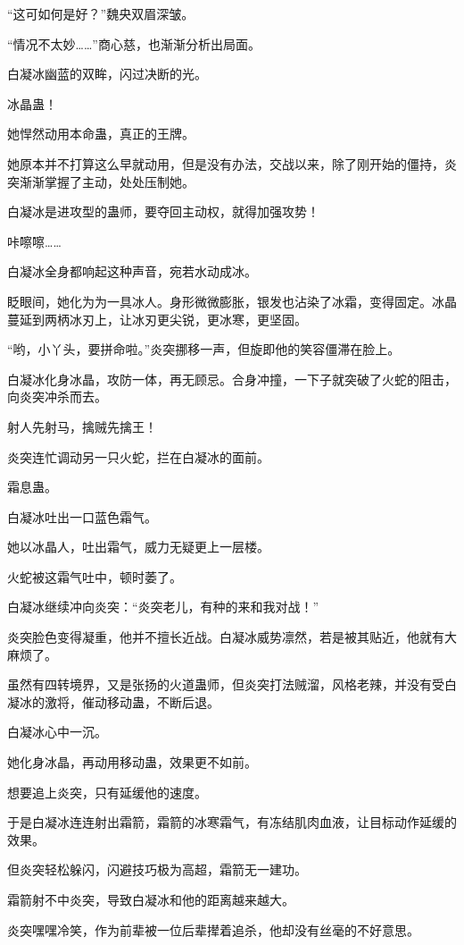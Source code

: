 \begin{this_body}
“这可如何是好？”魏央双眉深皱。

“情况不太妙……”商心慈，也渐渐分析出局面。

白凝冰幽蓝的双眸，闪过决断的光。

冰晶蛊！

她悍然动用本命蛊，真正的王牌。

她原本并不打算这么早就动用，但是没有办法，交战以来，除了刚开始的僵持，炎突渐渐掌握了主动，处处压制她。

白凝冰是进攻型的蛊师，要夺回主动权，就得加强攻势！

咔嚓嚓……

白凝冰全身都响起这种声音，宛若水动成冰。

眨眼间，她化为为一具冰人。身形微微膨胀，银发也沾染了冰霜，变得固定。冰晶蔓延到两柄冰刃上，让冰刃更尖锐，更冰寒，更坚固。

“哟，小丫头，要拼命啦。”炎突挪移一声，但旋即他的笑容僵滞在脸上。

白凝冰化身冰晶，攻防一体，再无顾忌。合身冲撞，一下子就突破了火蛇的阻击，向炎突冲杀而去。

射人先射马，擒贼先擒王！

炎突连忙调动另一只火蛇，拦在白凝冰的面前。

霜息蛊。

白凝冰吐出一口蓝色霜气。

她以冰晶人，吐出霜气，威力无疑更上一层楼。

火蛇被这霜气吐中，顿时萎了。

白凝冰继续冲向炎突：“炎突老儿，有种的来和我对战！”

炎突脸色变得凝重，他并不擅长近战。白凝冰威势凛然，若是被其贴近，他就有大麻烦了。

虽然有四转境界，又是张扬的火道蛊师，但炎突打法贼溜，风格老辣，并没有受白凝冰的激将，催动移动蛊，不断后退。

白凝冰心中一沉。

她化身冰晶，再动用移动蛊，效果更不如前。

想要追上炎突，只有延缓他的速度。

于是白凝冰连连射出霜箭，霜箭的冰寒霜气，有冻结肌肉血液，让目标动作延缓的效果。

但炎突轻松躲闪，闪避技巧极为高超，霜箭无一建功。

霜箭射不中炎突，导致白凝冰和他的距离越来越大。

炎突嘿嘿冷笑，作为前辈被一位后辈撵着追杀，他却没有丝毫的不好意思。


\end{this_body}
